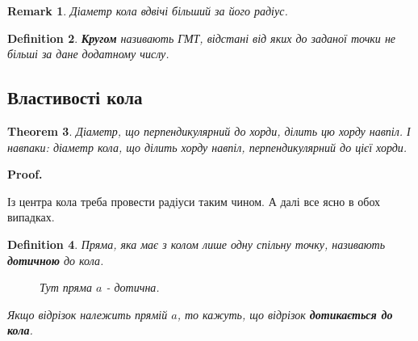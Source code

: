 \documentclass[a4paper, 10pt]{article}
\makeatletter
\def\qed{$\blacksquare$}
\theoremstyle{theoremdd}
\newtheorem{theorem}{Theorem}[subsection]
\theoremstyle{theoremdd}
\theoremstyle{theoremdd}
\newtheorem{definition}[theorem]{Definition}
\theoremstyle{theoremdd}
\theoremstyle{theoremdd}
\theoremstyle{theoremdd}
\theoremstyle{theoremdd}
\newtheorem{remark}[theorem]{Remark}
\theoremstyle{theoremdd}
\theoremstyle{theoremdd}
\renewenvironment{proof}[1][Proof.\\]{\par
\pushQED{\hfill \qed}%
\normalfont \topsep6\p@\@plus6\p@\relax
\trivlist
\item\relax
{\bfseries
#1\@addpunct{.}}\hspace\labelsep\ignorespaces
}{%
\popQED\endtrivlist\@endpefalse
}
\makeatother
\begin{document}
\begin{remark}
Діаметр кола вдвічі більший за його радіус.
\end{remark}

\begin{definition}
\textbf{Кругом} називають ГМТ, відстані від яких до заданої точки не більші за дане додатному числу.
\end{definition}

\subsection{Властивості кола}
\begin{theorem}
Діаметр, що перпендикулярний до хорди, ділить цю хорду навпіл. І навпаки: діаметр кола, що ділить хорду навпіл, перпендикулярний до цієї хорди.
\end{theorem}

\begin{proof}
Із центра кола треба провести радіуси таким чином. А далі все ясно в обох випадках.
\begin{figure}[H]
\centering
{}
\end{figure}
\end{proof}

\begin{definition}
Пряма, яка має з колом лише одну спільну точку, називають \textbf{дотичною} до кола.
\begin{figure}[H]
\centering
{}
\caption*{Тут пряма $a$ - дотична.}
\end{figure}
Якщо відрізок належить прямій $a$, то кажуть, що відрізок \textbf{дотикається до кола}.
\end{definition}
\end{document}
